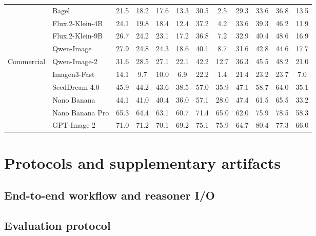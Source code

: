 \begin{table}[t]
{\begin{tabular}{@{}llcccccccccc@{}}
\addlinespace[2pt]
\multirow{4}{*}{Open}
& Bagel              & 21.5 & 18.2 & 17.6 & 13.3 & 30.5 &  2.5 & 29.3 & 33.6 & 36.8 & 13.5 \\
& Flux.2-Klein-4B    & 24.1 & 19.8 & 18.4 & 12.4 & 37.2 &  4.2 & 33.6 & 39.3 & 46.2 & 11.9 \\
& Flux.2-Klein-9B    & 26.7 & 24.2 & 23.1 & 17.2 & 36.8 &  7.2 & 32.9 & 40.4 & 48.6 & 16.9 \\
& Qwen-Image         & 27.9 & 24.8 & 24.3 & 18.6 & 40.1 &  8.7 & 31.6 & 42.8 & 44.6 & 17.7 \\
\midrule
\multirow{6}{*}{Commercial}
& Qwen-Image-2       & 31.6 & 28.5 & 27.1 & 22.1 & 42.2 & 12.7 & 36.3 & 45.5 & 48.2 & 21.0 \\
& Imagen3-Fast       & 14.1 &  9.7 & 10.0 &  6.9 & 22.2 &  1.4 & 21.4 & 23.2 & 23.7 &  7.0 \\
& SeedDream-4.0      & 45.9 & 44.2 & 43.6 & 38.5 & 57.0 & 35.9 & 47.1 & 58.7 & 64.0 & 35.1 \\
& Nano Banana        & 44.1 & 41.0 & 40.4 & 36.0 & 57.1 & 28.0 & 47.4 & 61.5 & 65.5 & 33.2 \\
& Nano Banana Pro    & 65.3 & 64.4 & 63.1 & 60.7 & 71.4 & 65.0 & 62.0 & 75.9 & 78.5 & 58.3 \\
& GPT-Image-2        & 71.0 & 71.2 & 70.1 & 69.2 & 75.1 & 75.9 & 64.7 & 80.4 & 77.3 & 66.0 \\
\bottomrule
\end{tabular}%
}
\end{table}

\section{Protocols and supplementary artifacts}
\subsection{End-to-end workflow and reasoner I/O}
\label{app:prompts}
\label{app:reasoner_io}
% 




\subsection{Evaluation protocol}
\label{app:eval}


